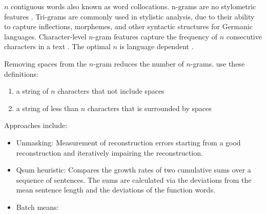 \begin{definition}
    [n-gram]
    $n$ contiguous words also known as word collocations. 
    n-grams are no stylometric features \citep{altakrori_topic_2021}.
    Tri-grams are commonly used in stylistic analysis, due to their ability to capture inflections, %
    morphemes, %
    and other syntactic structures for Germanic languages.
    Character-level $n$-gram features capture the frequency of $n$ consecutive characters in a text \citep{neal_surveying_2018}.
    The optimal $n$ is language dependent \citep{neal_surveying_2018}.
\end{definition}

\begin{definition}
    Removing spaces from the $n$-gram reduces the number of $n$-grams.
    \citet{koppel_authorship_2011} use these definitions:
    \begin{enumerate}
        \item a string of $n$ characters that not include spaces
        \item a string of less than $n$ characters that is surrounded by spaces
    \end{enumerate}
\end{definition}

\begin{definition}
    Approaches include:
    \begin{itemize}
        \item Unmasking: Measurement of reconstruction errors starting from a good reconstruction and iteratively impairing the reconstruction. %
        \item Qsum heuristic: Compares the growth rates of two cumulative sums over a sequence of sentences. The sums are calculated via the deviations from the mean sentence length and the deviations of the function words.
        \item Batch means: 
    \end{itemize}
\end{definition}

